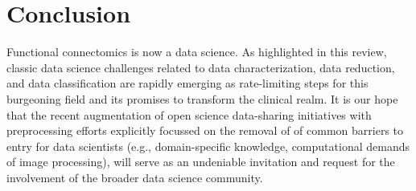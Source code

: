 \section {Conclusion}
Functional connectomics is now a data science. As highlighted in this review, classic data science challenges related to data characterization, data reduction, and data classification 
are rapidly emerging as rate-limiting steps for this burgeoning field and its promises to transform the clinical realm. It is our hope that the recent augmentation of open science data-sharing initiatives with preprocessing efforts explicitly focussed on the removal of of common barriers to entry for data scientists (e.g., domain-specific knowledge, computational demands of image processing), will serve as an undeniable invitation and request for the involvement of the broader data science community.
 


